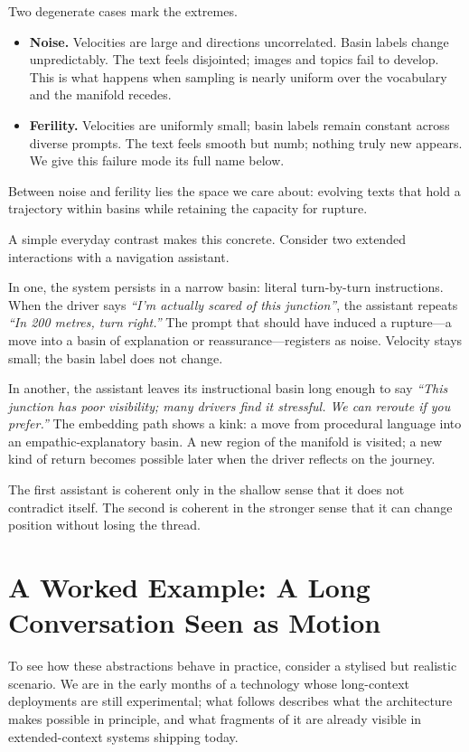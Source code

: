 \documentclass[12pt,a4paper]{article}
\begin{document}
Two degenerate cases mark the extremes.

\begin{itemize}
  \item \textbf{Noise.} Velocities are large and directions uncorrelated. Basin labels change unpredictably. The text feels disjointed; images and topics fail to develop. This is what happens when sampling is nearly uniform over the vocabulary and the manifold recedes.

  \item \textbf{Ferility.} Velocities are uniformly small; basin labels remain constant across diverse prompts. The text feels smooth but numb; nothing truly new appears. We give this failure mode its full name below.
\end{itemize}

Between noise and ferility lies the space we care about: evolving texts that hold a trajectory within basins while retaining the capacity for rupture.

A simple everyday contrast makes this concrete. Consider two extended interactions with a navigation assistant.

In one, the system persists in a narrow basin: literal turn-by-turn instructions. When the driver says \emph{``I'm actually scared of this junction''}, the assistant repeats \emph{``In 200 metres, turn right.''} The prompt that should have induced a rupture---a move into a basin of explanation or reassurance---registers as noise. Velocity stays small; the basin label does not change.

In another, the assistant leaves its instructional basin long enough to say \emph{``This junction has poor visibility; many drivers find it stressful. We can reroute if you prefer.''} The embedding path shows a kink: a move from procedural language into an empathic-explanatory basin. A new region of the manifold is visited; a new kind of return becomes possible later when the driver reflects on the journey.

The first assistant is coherent only in the shallow sense that it does not contradict itself. The second is coherent in the stronger sense that it can change position without losing the thread.


\section{A Worked Example: A Long Conversation Seen as Motion}

To see how these abstractions behave in practice, consider a stylised but realistic scenario. We are in the early months of a technology whose long-context deployments are still experimental; what follows describes what the architecture makes possible in principle, and what fragments of it are already visible in extended-context systems shipping today.
\end{document}
